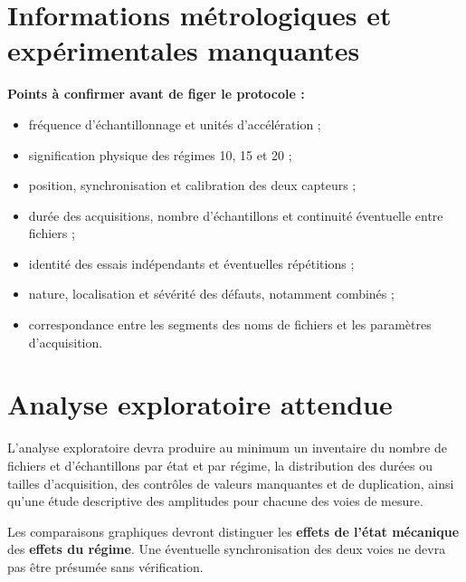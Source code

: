 \section{Informations métrologiques et expérimentales manquantes}
\begin{encadreattente}
\textbf{Points à confirmer avant de figer le protocole :}
\begin{itemize}
  \item fréquence d'échantillonnage et unités d'accélération ;
  \item signification physique des régimes 10, 15 et 20 ;
  \item position, synchronisation et calibration des deux capteurs ;
  \item durée des acquisitions, nombre d'échantillons et continuité éventuelle entre fichiers ;
  \item identité des essais indépendants et éventuelles répétitions ;
  \item nature, localisation et sévérité des défauts, notamment combinés ;
  \item correspondance entre les segments des noms de fichiers et les paramètres d'acquisition.
\end{itemize}
\end{encadreattente}

\section{Analyse exploratoire attendue}
L'analyse exploratoire devra produire au minimum un inventaire du nombre de fichiers et d'échantillons par état et par régime, la distribution des durées ou tailles d'acquisition, des contrôles de valeurs manquantes et de duplication, ainsi qu'une étude descriptive des amplitudes pour chacune des voies de mesure.

Les comparaisons graphiques devront distinguer les \textbf{effets de l'état mécanique} des \textbf{effets du régime}. Une éventuelle synchronisation des deux voies ne devra pas être présumée sans vérification.

